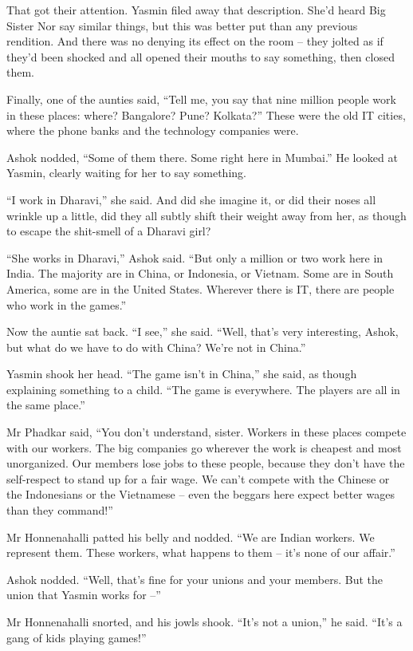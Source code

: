 That got their attention. Yasmin filed away that description. She'd
heard Big Sister Nor say similar things, but this was better put
than any previous rendition. And there was no denying its effect on
the room -- they jolted as if they'd been shocked and all opened
their mouths to say something, then closed them.

Finally, one of the aunties said, ``Tell me, you say that nine
million people work in these places: where? Bangalore? Pune?
Kolkata?'' These were the old IT cities, where the phone banks and
the technology companies were.

Ashok nodded, ``Some of them there. Some right here in Mumbai.'' He
looked at Yasmin, clearly waiting for her to say something.

``I work in Dharavi,'' she said. And did she imagine it, or did their
noses all wrinkle up a little, did they all subtly shift their
weight away from her, as though to escape the shit-smell of a
Dharavi girl?

``She works in Dharavi,'' Ashok said. ``But only a million or two work
here in India. The majority are in China, or Indonesia, or Vietnam.
Some are in South America, some are in the United States. Wherever
there is IT, there are people who work in the games.''

Now the auntie sat back. ``I see,'' she said. ``Well, that's very
interesting, Ashok, but what do we have to do with China? We're not
in China.''

Yasmin shook her head. ``The game isn't in China,'' she said, as
though explaining something to a child. ``The game is everywhere.
The players are all in the same place.''

Mr Phadkar said, ``You don't understand, sister. Workers in these
places compete with our workers. The big companies go wherever the
work is cheapest and most unorganized. Our members lose jobs to
these people, because they don't have the self-respect to stand up
for a fair wage. We can't compete with the Chinese or the
Indonesians or the Vietnamese -- even the beggars here expect
better wages than they command!''

Mr Honnenahalli patted his belly and nodded. ``We are Indian
workers. We represent them. These workers, what happens to them --
it's none of our affair.''

Ashok nodded. ``Well, that's fine for your unions and your members.
But the union that Yasmin works for --''

Mr Honnenahalli snorted, and his jowls shook. ``It's not a union,''
he said. ``It's a gang of kids playing games!''

